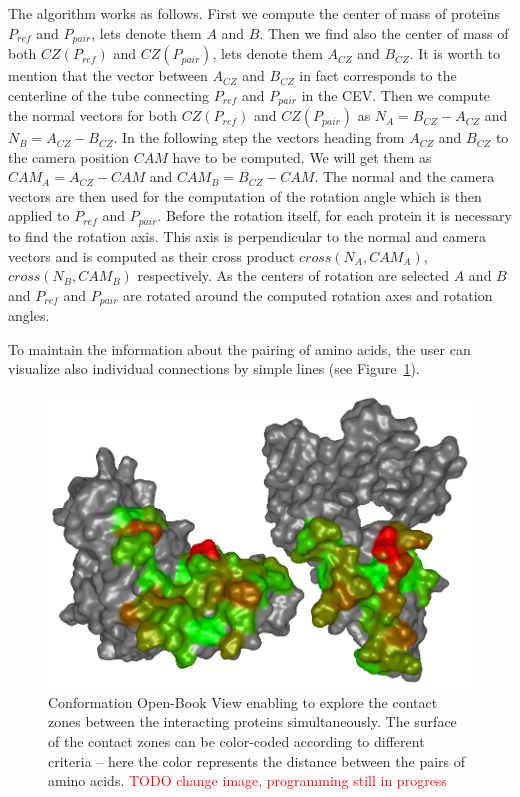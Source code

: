 \documentclass[journal]{vgtc}                %
\begin{document}
The algorithm works as follows.
First we compute the center of mass of proteins $P_{ref}$ and $P_{pair}$, lets denote them $A$ and $B$.
Then we find also the center of mass of both $CZ(P_{ref})$ and $CZ(P_{pair})$, lets denote them $A_{CZ}$ and $B_{CZ}$.
It is worth to mention that the vector between $A_{CZ}$ and $B_{CZ}$ in fact corresponds to the centerline of the tube connecting $P_{ref}$ and $P_{pair}$ in the CEV.
Then we compute the normal vectors for both $CZ(P_{ref})$ and $CZ(P_{pair})$ as $N_A = B_{CZ} - A_{CZ}$ and $N_B = A_{CZ} - B_{CZ}$.
In the following step the vectors heading from $A_{CZ}$ and $B_{CZ}$ to the camera position $CAM$ have to be computed.
We will get them as $CAM_A = A_{CZ} - CAM$ and $CAM_B = B_{CZ} - CAM$.
The normal and the camera vectors are then used for the computation of the rotation angle which is then applied to $P_{ref}$ and $P_{pair}$.
Before the rotation itself, for each protein it is necessary to find the rotation axis.
This axis is perpendicular to the normal and camera vectors and is computed as their cross product $cross(N_A,CAM_A)$, $cross(N_B,CAM_B)$ respectively.
As the centers of rotation are selected $A$ and $B$ and $P_{ref}$ and $P_{pair}$ are rotated around the computed rotation axes and rotation angles.

To maintain the information about the pairing of amino acids, the user can visualize also individual connections by simple lines (see Figure~\ref{fig:book}).

\begin{figure}[bt]
  \centering
  \includegraphics[width=0.8\columnwidth]{book.png}
  \caption{Conformation Open-Book View enabling to explore the contact zones between the interacting proteins simultaneously. The surface of the contact zones can be color-coded according to different criteria -- here the color represents the distance between the pairs of amino acids. \textcolor{red}{TODO change image, programming still in progress}}
  \label{fig:book}
\end{figure}
\end{document}
